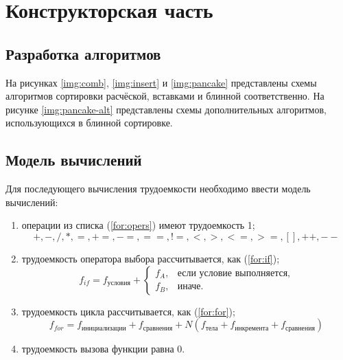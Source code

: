 \chapter{Конструкторская часть}

\section{Разработка алгоритмов}

На рисунках \ref{img:comb}, \ref{img:insert} и \ref{img:pancake} представлены схемы алгоритмов сортировки расчёской, вставками и блинной соответственно.
На рисунке \ref{img:pancake-alt} представлены схемы дополнительных алгоритмов, использующихся в блинной сортировке.

\clearpage
{}
\clearpage

\section{Модель вычислений}

Для последующего вычисления трудоемкости необходимо ввести модель вычислений:
\begin{enumerate}
    \item операции из списка (\ref{for:opers}) имеют трудоемкость 1;
        \begin{equation}
            \label{for:opers}
            +, -, /, *, =, +=, -=, ==, !=, <, >, <=, >=, [], ++, {-}-
        \end{equation}
    \item трудоемкость оператора выбора  рассчитывается, как (\ref{for:if});
	\begin{equation}
        \label{for:if}
        f_{if} = f_{\text{условия}} +
        \begin{cases}
        f_A, & \text{если условие выполняется,}\\
        f_B, & \text{иначе.}
        \end{cases}
	\end{equation}
\item трудоемкость цикла рассчитывается, как (\ref{for:for});
    \begin{equation}
        \label{for:for}
        f_{for} = f_{\text{инициализации}} + f_{\text{сравнения}} + N(f_{\text{тела}} + f_{\text{инкремента}} + f_{\text{сравнения}})
    \end{equation}
	\item трудоемкость вызова функции равна 0.
\end{enumerate}


